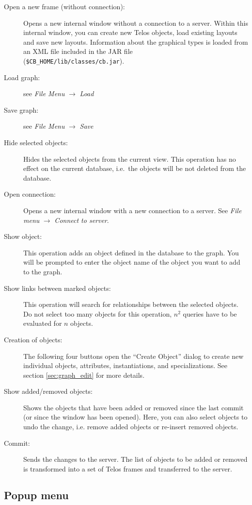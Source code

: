 \begin{description}
\item[Open a new frame (without connection):] Opens a new internal window without a connection
to a server. Within this internal window, you can create new Telos objects, load existing
layouts and save new layouts. Information about the graphical types is loaded
from an XML file included in the JAR file\\ (\verb+$CB_HOME/lib/classes/cb.jar+).
\item[Load graph:] see {\em File Menu} $\rightarrow$ {\em Load}
\item[Save graph:] see {\em File Menu} $\rightarrow$ {\em Save}
\item[Hide selected objects:] Hides the selected objects from the current
view. This operation has no effect on the current database, i.e.\ the objects
will be not deleted from the database.
\item[Open connection:] Opens a new internal window with a new connection to
a server. See {\em File menu} $\rightarrow$ {\em Connect to server}.
\item[Show object:] This operation adds an object defined in the database to the graph.
You will be prompted to enter the object name of the object you want to
add to the graph.
\item[Show links between marked objects:] This operation will search for
relationships between the selected objects. Do not select too many objects
for this operation, $n^2$ queries have to be evaluated for $n$ objects.
\item[Creation of objects:] The following four buttons open the ``Create Object''
dialog to create new individual objects, attributes, instantiations, and specializations.
See section \ref{sec:graph_edit} for more details.
\item[Show added/removed objects:] Shows the objects that have been added or
removed since the last commit (or since the window has been opened).
Here, you can also select objects to undo the change, i.e. remove added objects
or re-insert removed objects.
\item[Commit:] Sends the changes to the server. The list of objects to be added
or removed is transformed into a set of Telos frames and transferred to the
server.
\end{description}

\subsection{Popup menu}
\label{sec:graphed:PopupMenu}

